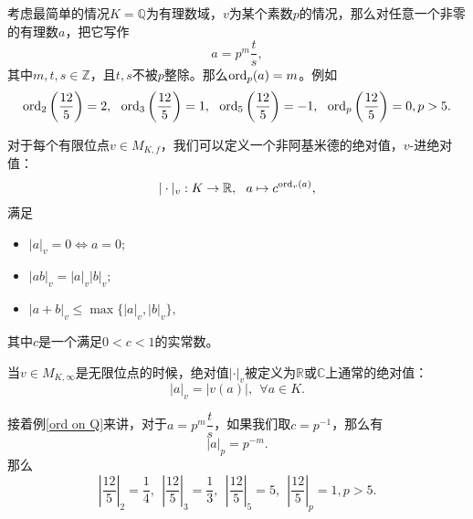 \begin{example} \label{ord on Q}
考虑最简单的情况$K = \mathbb{Q}$为有理数域，$v$为某个素数$p$的情况，那么对任意一个非零的有理数$a$，把它写作
\begin{equation}
a = p^m\dfrac{t}{s},
\end{equation}
其中$m,t,s\in\mathbb{Z}$，且$t,s$不被$p$整除。那么$\operatorname{ord}_p(a) = m$。例如
\begin{equation}
\operatorname{ord}_2\left(\dfrac{12}{5}\right) = 2, ~~ \operatorname{ord}_3\left(\dfrac{12}{5}\right) = 1, ~~ \operatorname{ord}_5\left(\dfrac{12}{5}\right) = -1, ~~ \operatorname{ord}_p\left(\dfrac{12}{5}\right) = 0, p>5.
\end{equation}
\end{example}

对于每个有限位点$v\in M_{K,f}$，我们可以定义一个非阿基米德的绝对值，$v$-进绝对值：
\begin{equation} \label{v-adic abs value}
|\cdot|_v: K \to \mathbb{R}, ~~ a \mapsto c^{\operatorname{ord}_v(a)},
\end{equation}
满足
\begin{itemize}
\item $|a|_v = 0 \Leftrightarrow a = 0;$
\item $|ab|_v = |a|_v|b|_v;$
\item $|a+b|_v \leqslant \max\{|a|_v, |b|_v\},$
\end{itemize}
其中$c$是一个满足$0<c<1$的实常数。

当$v\in M_{K,\infty}$是无限位点的时候，绝对值$|\cdot|_v$被定义为$\mathbb{R}$或$\mathbb{C}$上通常的绝对值：
\begin{equation}
|a|_v = |v(a)|, ~~ \forall a \in K.
\end{equation}

\begin{example} \label{abs values on Q}
接着例\ref{ord on Q}来讲，对于$a = p^m\dfrac{t}{s}$，如果我们取$c = p^{-1}$，那么有
\begin{equation}
|a|_p = p^{-m}.
\end{equation}
那么
\begin{equation}
\left|\dfrac{12}{5}\right|_2 = \dfrac{1}{4}, ~~ \left|\dfrac{12}{5}\right|_3 = \dfrac{1}{3}, ~~ \left|\dfrac{12}{5}\right|_5 = 5, ~~ \left|\dfrac{12}{5}\right|_p = 1, p>5.
\end{equation}
\end{example}

